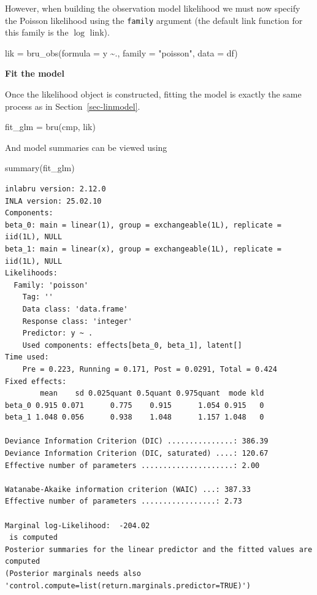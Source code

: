 \documentclass[
  letterpaper,
  DIV=11,
  numbers=noendperiod]{scrartcl}
\newenvironment{Shaded}{\begin{snugshade}}{\end{snugshade}}
\newcommand{\AttributeTok}[1]{\textcolor[rgb]{0.40,0.45,0.13}{#1}}
\newcommand{\FunctionTok}[1]{\textcolor[rgb]{0.28,0.35,0.67}{#1}}
\newcommand{\NormalTok}[1]{\textcolor[rgb]{0.00,0.23,0.31}{#1}}
\newcommand{\OtherTok}[1]{\textcolor[rgb]{0.00,0.23,0.31}{#1}}
\newcommand{\SpecialCharTok}[1]{\textcolor[rgb]{0.37,0.37,0.37}{#1}}
\newcommand{\StringTok}[1]{\textcolor[rgb]{0.13,0.47,0.30}{#1}}
\begin{document}
However, when building the observation model likelihood we must now
specify the Poisson likelihood using the \texttt{family} argument (the
default link function for this family is the \(\log\) link).

\begin{Shaded}
\begin{Highlighting}[]
\NormalTok{lik }\OtherTok{=}  \FunctionTok{bru\_obs}\NormalTok{(}\AttributeTok{formula =}\NormalTok{ y }\SpecialCharTok{\textasciitilde{}}\NormalTok{.,}
            \AttributeTok{family =} \StringTok{"poisson"}\NormalTok{,}
            \AttributeTok{data =}\NormalTok{ df)}
\end{Highlighting}
\end{Shaded}

\textbf{Fit the model}

Once the likelihood object is constructed, fitting the model is exactly
the same process as in Section~\ref{sec-linmodel}.

\begin{Shaded}
\begin{Highlighting}[]
\NormalTok{fit\_glm }\OtherTok{=} \FunctionTok{bru}\NormalTok{(cmp, lik)}
\end{Highlighting}
\end{Shaded}

And model summaries can be viewed using

\begin{Shaded}
\begin{Highlighting}[]
\FunctionTok{summary}\NormalTok{(fit\_glm)}
\end{Highlighting}
\end{Shaded}

\begin{verbatim}
inlabru version: 2.12.0
INLA version: 25.02.10
Components:
beta_0: main = linear(1), group = exchangeable(1L), replicate = iid(1L), NULL
beta_1: main = linear(x), group = exchangeable(1L), replicate = iid(1L), NULL
Likelihoods:
  Family: 'poisson'
    Tag: ''
    Data class: 'data.frame'
    Response class: 'integer'
    Predictor: y ~ .
    Used components: effects[beta_0, beta_1], latent[]
Time used:
    Pre = 0.223, Running = 0.171, Post = 0.0291, Total = 0.424 
Fixed effects:
        mean    sd 0.025quant 0.5quant 0.975quant  mode kld
beta_0 0.915 0.071      0.775    0.915      1.054 0.915   0
beta_1 1.048 0.056      0.938    1.048      1.157 1.048   0

Deviance Information Criterion (DIC) ...............: 386.39
Deviance Information Criterion (DIC, saturated) ....: 120.67
Effective number of parameters .....................: 2.00

Watanabe-Akaike information criterion (WAIC) ...: 387.33
Effective number of parameters .................: 2.73

Marginal log-Likelihood:  -204.02 
 is computed 
Posterior summaries for the linear predictor and the fitted values are computed
(Posterior marginals needs also 'control.compute=list(return.marginals.predictor=TRUE)')
\end{verbatim}
\end{document}
